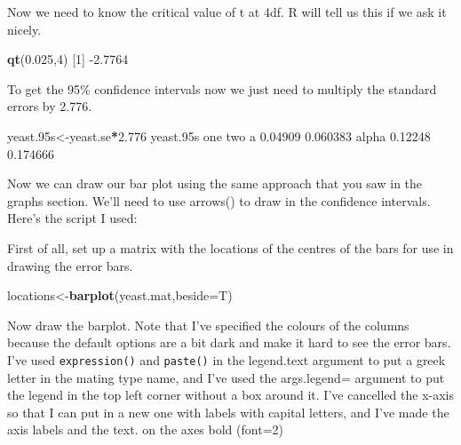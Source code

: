 \documentclass[
]{book}
\newenvironment{Shaded}{\begin{snugshade}}{\end{snugshade}}
\newcommand{\DataTypeTok}[1]{\textcolor[rgb]{0.13,0.29,0.53}{#1}}
\newcommand{\DecValTok}[1]{\textcolor[rgb]{0.00,0.00,0.81}{#1}}
\newcommand{\FloatTok}[1]{\textcolor[rgb]{0.00,0.00,0.81}{#1}}
\newcommand{\KeywordTok}[1]{\textcolor[rgb]{0.13,0.29,0.53}{\textbf{#1}}}
\newcommand{\NormalTok}[1]{#1}
\newcommand{\OperatorTok}[1]{\textcolor[rgb]{0.81,0.36,0.00}{\textbf{#1}}}
\begin{document}
Now we need to know the critical value of t at 4df. R will tell us this if we ask it nicely.

\begin{Shaded}
\begin{Highlighting}[]
\KeywordTok{qt}\NormalTok{(}\FloatTok{0.025}\NormalTok{,}\DecValTok{4}\NormalTok{)}
\NormalTok{[}\DecValTok{1}\NormalTok{] }\FloatTok{-2.7764}
\end{Highlighting}
\end{Shaded}

To get the 95\% confidence intervals now we just need to multiply the standard errors by 2.776.

\begin{Shaded}
\begin{Highlighting}[]
\NormalTok{yeast}\FloatTok{.95}\NormalTok{s<-yeast.se}\OperatorTok{*}\FloatTok{2.776}
\NormalTok{yeast}\FloatTok{.95}\NormalTok{s}
\NormalTok{          one      two}
\NormalTok{a     }\FloatTok{0.04909} \FloatTok{0.060383}
\NormalTok{alpha }\FloatTok{0.12248} \FloatTok{0.174666}
\end{Highlighting}
\end{Shaded}

Now we can draw our bar plot using the same approach that you saw in the graphs section. We'll need to use arrows() to draw in the confidence intervals. Here's the script I used:

First of all, set up a matrix with the locations of the centres of the bars for use in drawing the error bars.

\begin{Shaded}
\begin{Highlighting}[]
\NormalTok{locations<-}\KeywordTok{barplot}\NormalTok{(yeast.mat,}\DataTypeTok{beside=}\NormalTok{T)}
\end{Highlighting}
\end{Shaded}

Now draw the barplot. Note that I've specified the colours of the columns because the default options are a bit dark and make it hard to see the error bars. I've used \texttt{expression()} and \texttt{paste()} in the legend.text argument to put a greek letter in the mating type name, and I've used the args.legend= argument to put the legend in the top left corner without a box around it. I've cancelled the x-axis so that I can put in a new one with labels with capital letters, and I've made the axis labels and the text. on the axes bold (font=2)
\end{document}
